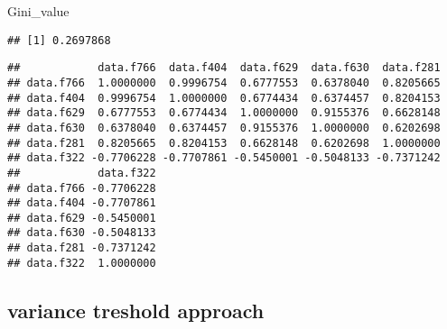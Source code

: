 \documentclass[]{book}
\newenvironment{Shaded}{\begin{snugshade}}{\end{snugshade}}
\newcommand{\KeywordTok}[1]{\textcolor[rgb]{0.13,0.29,0.53}{\textbf{#1}}}
\newcommand{\DataTypeTok}[1]{\textcolor[rgb]{0.13,0.29,0.53}{#1}}
\newcommand{\StringTok}[1]{\textcolor[rgb]{0.31,0.60,0.02}{#1}}
\newcommand{\CommentTok}[1]{\textcolor[rgb]{0.56,0.35,0.01}{\textit{#1}}}
\newcommand{\OperatorTok}[1]{\textcolor[rgb]{0.81,0.36,0.00}{\textbf{#1}}}
\newcommand{\NormalTok}[1]{#1}
\theoremstyle{definition}
\theoremstyle{definition}
\theoremstyle{definition}
\theoremstyle{remark}
\begin{document}
\begin{Shaded}
\begin{Highlighting}[]
\NormalTok{Gini_value}
\end{Highlighting}
\end{Shaded}

\begin{verbatim}
## [1] 0.2697868
\end{verbatim}

\begin{Shaded}
\end{Shaded}

\begin{verbatim}
##            data.f766  data.f404  data.f629  data.f630  data.f281
## data.f766  1.0000000  0.9996754  0.6777553  0.6378040  0.8205665
## data.f404  0.9996754  1.0000000  0.6774434  0.6374457  0.8204153
## data.f629  0.6777553  0.6774434  1.0000000  0.9155376  0.6628148
## data.f630  0.6378040  0.6374457  0.9155376  1.0000000  0.6202698
## data.f281  0.8205665  0.8204153  0.6628148  0.6202698  1.0000000
## data.f322 -0.7706228 -0.7707861 -0.5450001 -0.5048133 -0.7371242
##            data.f322
## data.f766 -0.7706228
## data.f404 -0.7707861
## data.f629 -0.5450001
## data.f630 -0.5048133
## data.f281 -0.7371242
## data.f322  1.0000000
\end{verbatim}

\subsection{variance treshold
approach}\label{variance-treshold-approach}
\end{document}
